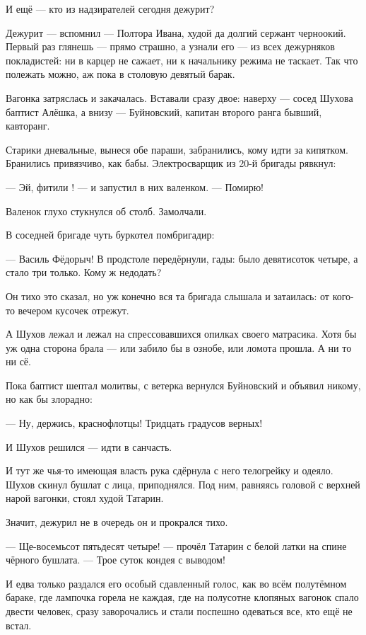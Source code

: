 И ещё --- кто из надзирателей сегодня дежурит?

Дежурит --- вспомнил --- Полтора Ивана, худой да долгий сержант черноокий. Первый раз глянешь --- 
прямо страшно, а узнали его --- из всех дежурняков покладистей: ни в карцер не сажает, ни к 
начальнику режима не таскает. Так что полежать можно, аж пока в столовую девятый барак.

Вагонка затряслась и закачалась. Вставали сразу двое: наверху --- сосед Шухова баптист 
Алёшка, а внизу --- Буйновский, капитан второго ранга бывший, кавторанг.

Старики дневальные, вынеся обе параши, забранились, кому идти за кипятком. Бранились 
привязчиво, как бабы. Электросварщик из 20-й бригады рявкнул:

--- Эй, фитили ! --- и запустил в них валенком. --- Помирю!

Валенок глухо стукнулся об столб. Замолчали.

В соседней бригаде чуть буркотел помбригадир:

--- Василь Фёдорыч! В продстоле передёрнули, гады: было девятисоток четыре, а стало три только. 
Кому ж недодать?

Он тихо это сказал, но уж конечно вся та бригада слышала и затаилась: от кого-то вечером 
кусочек отрежут.

А Шухов лежал и лежал на спрессовавшихся опилках своего матрасика. Хотя бы уж одна сторона 
брала --- или забило бы в ознобе, или ломота прошла. А ни то ни сё.

Пока баптист шептал молитвы, с ветерка вернулся Буйновский и объявил никому, но как бы 
злорадно:

--- Ну, держись, краснофлотцы! Тридцать градусов верных!

И Шухов решился --- идти в санчасть.

И тут же чья-то имеющая власть рука сдёрнула с него телогрейку и одеяло. Шухов скинул бушлат 
с лица, приподнялся. Под ним, равняясь головой с верхней нарой вагонки, стоял худой Татарин.

Значит, дежурил не в очередь он и прокрался тихо.

--- Ще-восемьсот пятьдесят четыре! --- прочёл Татарин с белой латки на спине чёрного бушлата. --- 
Трое суток кондея с выводом!

И едва только раздался его особый сдавленный голос, как во всём полутёмном бараке, где 
лампочка горела не каждая, где на полусотне клопяных вагонок спало двести человек, сразу 
заворочались и стали поспешно одеваться все, кто ещё не встал.

